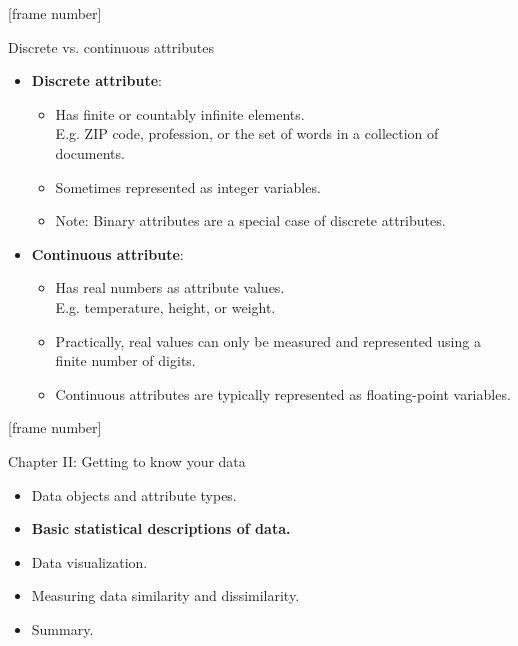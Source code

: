 \documentclass[aspectratio=169,t]{beamer}
\begin{document}
  {
    [frame number]
    \begin{frame}{Discrete vs. continuous attributes }
    \begin{itemize}
        \item \textbf{Discrete attribute}:
              \begin{itemize}
                  \item Has finite or countably infinite elements.\\
                        E.g. ZIP code, profession, or the set of words in a collection of documents.
                  \item Sometimes represented as integer variables.
                  \item Note: Binary attributes are a special case of discrete attributes.
              \end{itemize}
        \item \textbf{Continuous attribute}:
            \begin{itemize}
                \item Has real numbers as attribute values.\\
                      E.g. temperature, height, or weight.
                \item Practically, real values can only be measured and represented using a finite number of digits.
                \item Continuous attributes are typically represented as floating-point variables.
            \end{itemize}
        \end{itemize}
    \end{frame}
  }

  {
    [frame number]
    \begin{frame}{Chapter II: Getting to know your data}
        \begin{itemize}
            \item Data objects and attribute types.
            \item \textbf{Basic statistical descriptions of data.}
            \item Data visualization.
            \item Measuring data similarity and dissimilarity.
            \item Summary.
        \end{itemize}
    \end{frame}
  }
\end{document}
